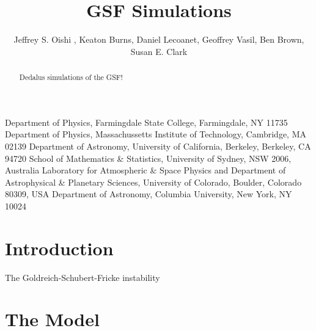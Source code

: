 \documentclass{jfm}
\begin{document}
\newtheorem{lemma}{Lemma}
\newtheorem{corollary}{Corollary}

\newcommand\Sch{\mbox{\textit{Sc}}} %

\title{GSF Simulations}

\author
 {
 Jeffrey S. Oishi
  ,
  Keaton Burns,
  Daniel Lecoanet,
  Geoffrey Vasil,
  Ben Brown,
  Susan E. Clark
  }

\affiliation
{
Department of Physics, Farmingdale State College, Farmingdale, NY 11735
Department of Physics, Massachussetts Institute of Technology, Cambridge, MA 02139
Department of Astronomy, University of California, Berkeley, Berkeley, CA 94720
School of Mathematics \& Statistics, University of Sydney, NSW 2006, Australia
Laboratory for Atmospheric \& Space Physics and Department of Astrophysical \& Planetary Sciences, University of Colorado, Boulder, Colorado 80309, USA
Department of Astronomy, Columbia University, New York, NY 10024

}

\maketitle

\begin{abstract}
Dedalus simulations of the GSF!
\end{abstract}

\section{Introduction}
\label{sec:intro}
The Goldreich-Schubert-Fricke instability \citep{1967ApJ...150..571G}

\section{The Model}
\label{sec:model}
\end{document}

